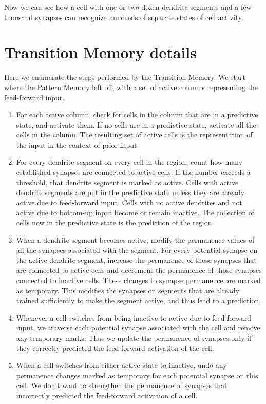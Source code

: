 Now we can see how a cell with one or two dozen dendrite segments and
a few thousand synapses can recognize hundreds of separate states of
cell activity.

\section*{Transition Memory details}

Here we enumerate the steps performed by the Transition Memory. We start
where the Pattern Memory left off, with a set of active columns
representing the feed-forward input.

\begin{enumerate}
\item For each active column, check for cells in the column that are
  in a predictive state, and activate them. If no cells are in a
  predictive state, activate all the cells in the column. The
  resulting set of active cells is the representation of the input in
  the context of prior input.

\item For every dendrite segment on every cell in the region, count
  how many established synapses are connected to active cells. If the
  number exceeds a threshold, that dendrite segment is marked as
  active. Cells with active dendrite segments are put in the
  predictive state unless they are already active due to feed-forward
  input. Cells with no active dendrites and not active due to
  bottom-up input become or remain inactive. The collection of cells
  now in the predictive state is the prediction of the region.

\item When a dendrite segment becomes active, modify the permanence
  values of all the synapses associated with the segment. For every
  potential synapse on the active dendrite segment, increase the
  permanence of those synapses that are connected to active cells and
  decrement the permanence of those synapses connected to inactive
  cells. These changes to synapse permanence are marked as temporary.
  This modifies the synapses on segments that are already trained
  sufficiently to make the segment active, and thus lead to a
  prediction. 

\item Whenever a cell switches from being inactive to active due to
  feed-forward input, we traverse each potential synapse associated
  with the cell and remove any temporary marks. Thus we update the
  permanence of synapses only if they correctly predicted the
  feed-forward activation of the cell.

\item When a cell switches from either active state to inactive, undo
  any permanence changes marked as temporary for each potential
  synapse on this cell. We don't want to strengthen the permanence of
  synapses that incorrectly predicted the feed-forward activation of a
  cell.
\end{enumerate}

